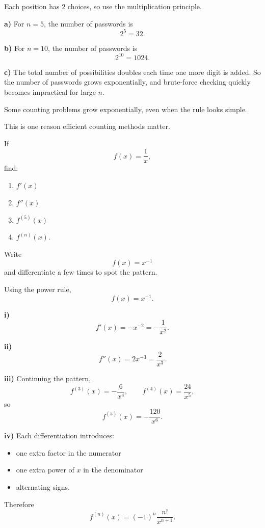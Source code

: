 \begin{hint}
Each position has $2$ choices, so use the multiplication principle.
\end{hint}

\begin{solution}
\textbf{a)} For $n=5$, the number of passwords is
\[
2^5=32.
\]

\textbf{b)} For $n=10$, the number of passwords is
\[
2^{10}=1024.
\]

\textbf{c)} The total number of possibilities doubles each time one more digit is added. So the number of passwords grows exponentially, and brute-force checking quickly becomes impractical for large $n$.
\end{solution}

\begin{takeaways}
\item Some counting problems grow exponentially, even when the rule looks simple.
\item This is one reason efficient counting methods matter.
\end{takeaways}

\begin{problem}
If
\[
f(x)=\frac{1}{x},
\]
find:
\begin{enumerate}[label=\roman*)]
\item $f'(x)$
\item $f''(x)$
\item $f^{(5)}(x)$
\item $f^{(n)}(x)$.
\end{enumerate}
\end{problem}

\begin{hint}
Write
\[
f(x)=x^{-1}
\]
and differentiate a few times to spot the pattern.
\end{hint}

\begin{solution}
Using the power rule,
\[
f(x)=x^{-1}.
\]

\textbf{i)}
\[
f'(x)=-x^{-2}=-\frac{1}{x^2}.
\]

\textbf{ii)}
\[
f''(x)=2x^{-3}=\frac{2}{x^3}.
\]

\textbf{iii)}
Continuing the pattern,
\[
f^{(3)}(x)=-\frac{6}{x^4},\qquad
f^{(4)}(x)=\frac{24}{x^5},
\]
so
\[
f^{(5)}(x)=-\frac{120}{x^6}.
\]

\textbf{iv)}
Each differentiation introduces:
\begin{itemize}[leftmargin=*]
  \item one extra factor in the numerator
  \item one extra power of $x$ in the denominator
  \item alternating signs.
\end{itemize}

Therefore
\[
\boxed{
f^{(n)}(x)=(-1)^n\frac{n!}{x^{n+1}}
}.
\]
\end{solution}

